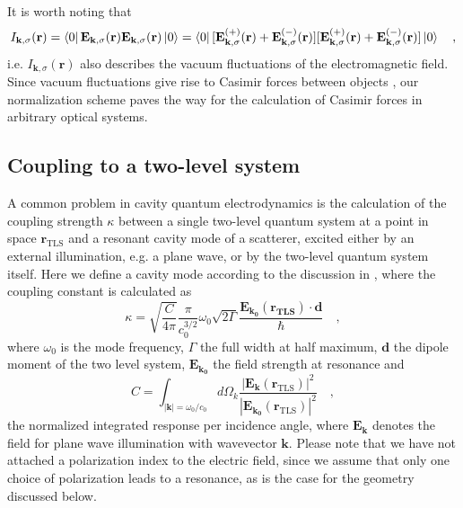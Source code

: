 \documentclass[10pt,letterpaper]{article}
\renewcommand{\vec}[1]{\mathbf{#1}}
\begin{document}
It is worth noting that
\begin{equation}
I_{\vec{k},\sigma}(\vec{r}) = \bra{0}\vec{E_{\vec{k},\sigma}}(\vec{r})\vec{E_{\vec{k},\sigma}}(\vec{r})\ket{0} = \bra{0}
[\vec{E^{(+)}_{\vec{k},\sigma}}(\vec{r})+\vec{E^{(-)}_{\vec{k},\sigma}}(\vec{r})][\vec{E^{(+)}_{\vec{k},\sigma}}(\vec{r})+\vec{E^{(-)}_{\vec{k},\sigma}}(\vec{r})]\ket{0} \quad ,
\end{equation}
i.e. $I_{\vec{k},\sigma}(\vec{r})$ also describes the vacuum  fluctuations of the electromagnetic field. Since vacuum fluctuations give rise to Casimir forces between objects \cite{Novotny2012}, our normalization scheme paves the way for the calculation of Casimir forces in arbitrary optical systems.

\subsection{Coupling to a two-level system}
\label{subsec:coupling}

A common problem in cavity quantum electrodynamics is the calculation of the coupling strength $\kappa$ between a single two-level quantum system at a point in space $\vec{r}_{\text{TLS}}$ and 
a resonant cavity mode of a scatterer, excited either by an external illumination, e.g. a plane wave, or by the two-level quantum system itself. Here we define a cavity mode according to the discussion in \cite{Placeholder}, where the coupling constant is calculated as
\begin{equation}
\kappa = \sqrt{\frac{C}{4\pi}}\frac{\pi}{c_0^{3/2}}\omega_0\sqrt{2\Gamma} \frac{\vec{E}_{\vec{k_0}}(\vec{r_{\text{TLS}}})\cdot\vec{d}}{\hbar} \quad , \label{eq:kappa_ff}
\end{equation}
where $\omega_0$ is the mode frequency, $\Gamma$ the full width at half maximum, $\vec{d}$ the dipole moment of the two level system, $\vec{E}_{\vec{k_0}}$ the field strength at resonance and
\begin{equation}
C = \int_{|\vec{k}| = \omega_0/c_0} d\Omega_k \frac{|\vec{E}_{\vec{k}}(\vec{r}_{\text{TLS}})|^2}{|\vec{E}_{\vec{k_0}}(\vec{r}_{\text{TLS}})|^2} \quad ,
\end{equation}
the normalized integrated response per incidence angle, where $\vec{E}_{\vec{k}}$ denotes the field for plane wave illumination with wavevector $\vec{k}$. Please note that we have not attached a polarization index to the electric field, since we assume that only one choice of polarization leads to a resonance, as is the case for the geometry discussed below.
\end{document}

